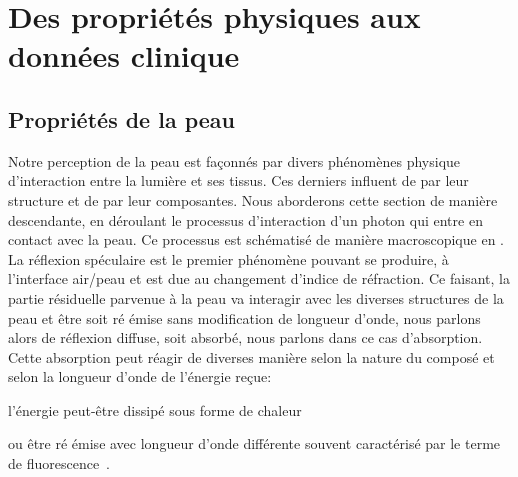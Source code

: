 \chapter{Des propriétés physiques aux données clinique}
\label{chap:chapter_2}

\section{Propriétés de la peau}
Notre perception de la peau est façonnés par divers phénomènes physique d'interaction entre la lumière et ses tissus. Ces derniers influent de par leur structure et de par leur composantes. Nous aborderons cette section de manière descendante, en déroulant le processus d'interaction d'un photon qui entre en contact avec la peau. Ce processus est schématisé de manière macroscopique en . La réflexion spéculaire est le premier phénomène pouvant se produire, à l'interface air/peau et est due au changement d'indice de réfraction. Ce faisant, la partie résiduelle parvenue à la peau va interagir avec les diverses structures de la peau et être soit ré émise sans modification de longueur d'onde, nous parlons alors de réflexion diffuse, soit absorbé, nous parlons dans ce cas d'absorption. Cette absorption peut réagir de diverses manière selon la nature du composé et selon la longueur d'onde de l'énergie reçue: 
\begin{inenum}
\item l'énergie peut-être dissipé sous forme de chaleur
\item ou être ré émise avec longueur d'onde différente souvent caractérisé par le terme de fluorescence~\cite{Kollias2002}.
\end{inenum}\par

